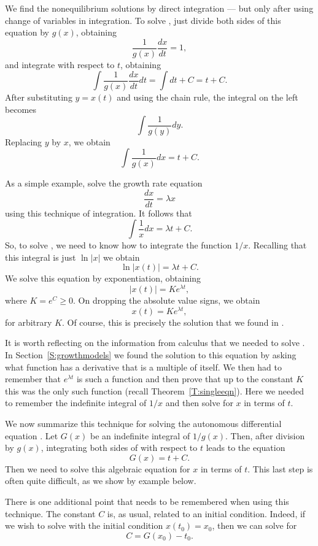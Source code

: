 We find the 
nonequilibrium solutions by direct integration --- but only after 
using change of variables in integration.  To solve ,
just divide both sides of this equation by $g(x)$, obtaining
\[
\frac{1}{g(x)}\frac{dx}{dt} = 1,
\]
and integrate with respect to $t$, obtaining
\[
\int \frac{1}{g(x)} \frac{dx}{dt} dt = \int dt + C = t + C.
\]
After substituting $y=x(t)$ and using the chain rule, the integral on 
the left becomes
\[
\int\frac{1}{g(y)}dy.
\]
Replacing $y$ by $x$, we obtain
\[
\int\frac{1}{g(x)}dx = t + C.
\]

As a simple example, solve the growth rate equation  
\begin{equation}  \label{lin1a} 
\frac{dx}{dt} = \lambda x
\end{equation}
using this technique of integration.  It follows that 
\[
\int \frac{1}{x}dx = \lambda t + C.
\]
So, to solve , we need to know how to integrate the function 
$1/x$.  Recalling that this integral is just $\ln |x|$ we obtain
\[
\ln |x(t)| = \lambda t + C.
\]
We solve this equation by exponentiation, obtaining
\[
|x(t)| = K e^{\lambda t},
\]
where $K = e^C \geq 0$.  On dropping the absolute value signs, we obtain
\[
x(t) =   K e^{\lambda t},
\]
for arbitrary $K$.  Of course, this is precisely the solution that we 
found in .  

It is worth reflecting on the information from calculus that we needed to 
solve .  In Section~\ref{S:growthmodels} we found the solution to 
this equation by asking what function has a derivative that is a multiple of 
itself.  We then had to remember that $e^{\lambda t}$ is such a function and 
then prove that up to the constant $K$ this was the only such function 
(recall Theorem~\ref{T:singleeqn}).  Here we needed to remember the 
indefinite integral of $1/x$ and then solve for $x$ in terms of $t$.  

We now summarize this technique for solving the autonomous differential 
equation .  Let $G(x)$ be an indefinite integral of $1/g(x)$. 
Then, after division by $g(x)$, integrating both sides of  
with respect to $t$ leads to the equation 
\[
G(x) = t + C.
\]
Then we need to solve this algebraic equation for $x$ in terms of $t$.  This
last step is often quite difficult, as we show by example below.

There is one additional point that needs to be remembered when using 
this technique.  The constant $C$ is, as usual, related to an initial
condition.  Indeed, if we wish to solve  with the initial
condition $x(t_0)=x_0$, then we can solve for 
\[
C = G(x_0) - t_0.
\]

